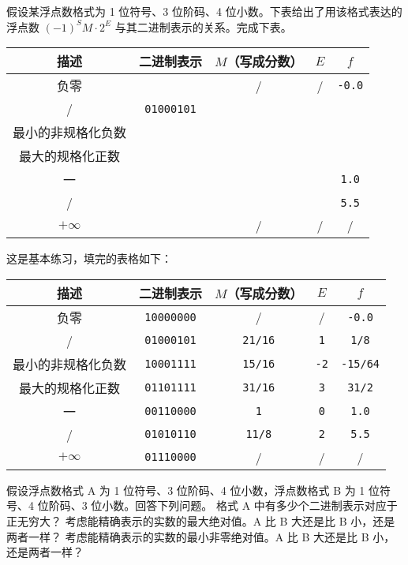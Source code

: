 \begin{problems}
		\pro 假设某浮点数格式为 1 位符号、3 位阶码、4 位小数。下表给出了用该格式表达的浮点数 $(-1)^SM \cdot 2^E$ 与其二进制表示的关系。完成下表。
		\begin{table}[H]
			\centering
			\begin{tabular}{|c|c|c|c|c|}
				\hline
				描述 & 二进制表示 & $M$（写成分数） & $E$ & $f$ \\ \hline
				负零 &  & / & / & \texttt{-0.0} \\ \hline
				/ & \verb|01000101| &  &  &  \\ \hline
				最小的非规格化负数 &  &  &  &  \\ \hline
				最大的规格化正数 &  &  &  &  \\ \hline
				一 &  &  &  & \texttt{1.0} \\ \hline
				/ &  &  &  & \texttt{5.5} \\ \hline
				$+\infty$ &  & / & / & / \\ \hline
			\end{tabular}
		\end{table}
		\sol 这是基本练习，填完的表格如下：
		\begin{table}[H]
			\centering
			\begin{tabular}{|c|c|c|c|c|}
				\hline
				描述 & 二进制表示 & $M$（写成分数） & $E$ & $f$ \\ \hline
				负零 & \verb|10000000| & / & / & \texttt{-0.0} \\ \hline
				/ & \verb|01000101| & \verb|21/16| & \verb|1| & \verb|1/8| \\ \hline
				最小的非规格化负数 & \verb|10001111| & \verb|15/16| & \verb|-2| & \verb|-15/64| \\ \hline
				最大的规格化正数 & \verb|01101111| & \verb|31/16| & \verb|3| & \verb|31/2| \\ \hline
				一 & \verb|00110000| & \verb|1| & \verb|0| & \texttt{1.0} \\ \hline
				/ & \verb|01010110| & \verb|11/8| & \verb|2| & \texttt{5.5} \\ \hline
				$+\infty$ & \verb|01110000| & / & / & / \\ \hline
			\end{tabular}
		\end{table}
		\pro 假设浮点数格式 A 为 1 位符号、3 位阶码、4 位小数，浮点数格式 B 为 1 位符号、4 位阶码、3 位小数。回答下列问题。
			\qn 格式 A 中有多少个二进制表示对应于正无穷大？
			\qn 考虑能精确表示的实数的最大绝对值。A 比 B 大还是比 B 小，还是两者一样？
			\qn 考虑能精确表示的实数的最小非零绝对值。A 比 B 大还是比 B 小，还是两者一样？

\end{problems}
